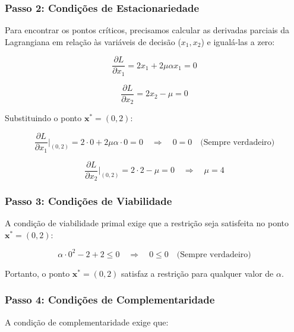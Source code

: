 \documentclass[a4paper, 12pt]{article}
\begin{document}
\subsubsection{Passo 2: Condi\c{c}\~oes de Estacionariedade}
Para encontrar os pontos cr\'iticos, precisamos calcular as derivadas parciais da Lagrangiana em rela\c{c}\~ao \`as vari\'aveis de decis\~ao ($x_1, x_2$) e igual\'a-las a zero:

\begin{equation*}
    \frac{\partial L}{\partial x_1} = 2x_1 + 2\mu \alpha x_1 = 0
\end{equation*}

\begin{equation*}
    \frac{\partial L}{\partial x_2} = 2x_2 - \mu = 0
\end{equation*}

Substituindo o ponto $\mathbf{x}^* = (0, 2)$:

\begin{equation*}
    \frac{\partial L}{\partial x_1}\bigg|_{(0, 2)} = 2 \cdot 0 + 2\mu \alpha \cdot 0 = 0 \quad \Rightarrow \quad 0 = 0 \quad \text{(Sempre verdadeiro)}
\end{equation*}

\begin{equation*}
    \frac{\partial L}{\partial x_2}\bigg|_{(0, 2)} = 2 \cdot 2 - \mu = 0 \quad \Rightarrow \quad \mu = 4
\end{equation*}

\subsubsection{Passo 3: Condi\c{c}\~oes de Viabilidade}
A condi\c{c}\~ao de viabilidade primal exige que a restri\c{c}\~ao seja satisfeita no ponto $\mathbf{x}^* = (0, 2)$:

\begin{equation*}
    \alpha \cdot 0^2 - 2 + 2 \leq 0 \quad \Rightarrow \quad 0 \leq 0 \quad \text{(Sempre verdadeiro)}
\end{equation*}

Portanto, o ponto $\mathbf{x}^* = (0, 2)$ satisfaz a restri\c{c}\~ao para qualquer valor de $\alpha$.

\subsubsection{Passo 4: Condi\c{c}\~oes de Complementaridade}
A condi\c{c}\~ao de complementaridade exige que:
\end{document}
